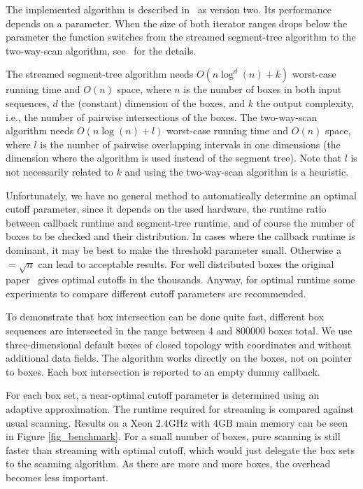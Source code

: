 The implemented algorithm is described in~\cite{cgal:ze-fsbi-02} as
version two.  Its performance depends on a  parameter.
When the size of both iterator ranges drops below the 
parameter the function switches from the streamed segment-tree
algorithm to the two-way-scan algorithm, see~\cite{cgal:ze-fsbi-02}
for the details.

The streamed segment-tree algorithm needs $O(n \log^d (n) + k)$
worst-case running time and $O(n)$ space, where $n$ is the number of
boxes in both input sequences, $d$ the (constant) dimension of the
boxes, and $k$ the output complexity, i.e., the number of pairwise
intersections of the boxes. The two-way-scan algorithm needs $O(n \log
(n) + l)$ worst-case running time and $O(n)$ space, where $l$ is the
number of pairwise overlapping intervals in one dimensions (the
dimension where the algorithm is used instead of the segment tree).
Note that $l$ is not necessarily related to $k$ and using the
two-way-scan algorithm is a heuristic.

Unfortunately, we have no general method to automatically determine an
optimal cutoff parameter, since it depends on the used hardware, the
runtime ratio between callback runtime and segment-tree runtime, and
of course the number of boxes to be checked and their distribution. In
cases where the callback runtime is dominant, it may be best to make
the threshold parameter small. Otherwise a $=\sqrt{n}$ can
lead to acceptable results. For well distributed boxes the original
paper~\cite{cgal:ze-fsbi-02} gives optimal cutoffs in the thousands.
Anyway, for optimal runtime some experiments to compare different
cutoff parameters are recommended.

To demonstrate that box intersection can be done quite fast, different
box sequences are intersected in the range between 4 and 800000 boxes
total.  We use three-dimensional default boxes of closed topology with
 coordinates and without additional data fields.  The
algorithm works directly on the boxes, not on pointer to boxes. Each
box intersection is reported to an empty dummy callback.

For each box set, a near-optimal cutoff parameter is determined using
an adaptive approximation. The runtime required for streaming is
compared against usual scanning.  Results on a Xeon 2.4GHz with 4GB
main memory can be seen in Figure \ref{fig_benchmark}. For a small
number of boxes, pure scanning is still faster than streaming with
optimal cutoff, which would just delegate the box sets to the scanning
algorithm. As there are more and more boxes, the overhead becomes less
important. 

